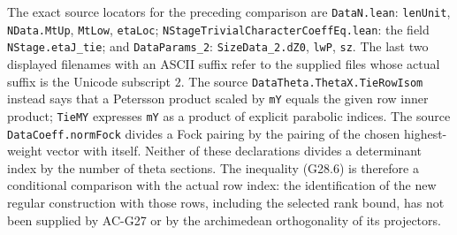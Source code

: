 \begin{remark}
The exact source locators for the preceding comparison are
\texttt{DataN.lean}: \texttt{lenUnit}, \texttt{NData.MtUp},
\texttt{MtLow}, \texttt{etaLoc};
\texttt{NStageTrivialCharacterCoeffEq.lean}: the field
\texttt{NStage.etaJ\_tie}; and
\texttt{DataParams\_2}: \texttt{SizeData\_2.dZ0},
\texttt{lwP}, \texttt{sz}.  The last two displayed filenames
with an ASCII suffix refer to the supplied files whose actual
suffix is the Unicode subscript $2$.
The source \texttt{DataTheta.ThetaX.TieRowIsom} instead says
that a Petersson product scaled by \texttt{mY} equals the
given row inner product; \texttt{TieMY} expresses
\texttt{mY} as a product of explicit parabolic indices.
The source \texttt{DataCoeff.normFock} divides a Fock pairing
by the pairing of the chosen highest-weight vector with itself.
Neither of these declarations divides a determinant index
by the number of theta sections.
The inequality (G28.6) is therefore a conditional comparison
with the actual row index: the identification of the new
regular construction with those rows, including the selected
rank bound, has not been supplied by AC-G27 or by the
archimedean orthogonality of its projectors.
\end{remark}

